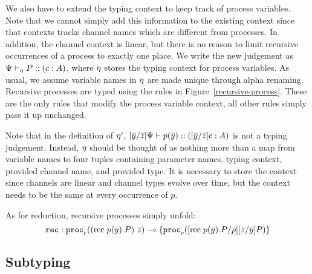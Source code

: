 \documentclass[a4paper,USenglish]{lipics-v2016}
\begin{document}
We also have to extend the typing context to keep track of process variables. Note that we cannot simply add this information to the existing context since that contexts tracks channel names which are different from processes. In addition, the channel context is linear, but there is no reason to limit recursive occurrences of a process to exactly one place. We write the new judgement as ${\Psi} \vdash_{\eta} P :: (c : A)$, where $\eta$ stores the typing context for process variables. As usual, we assume variable names in $\eta$ are made unique through alpha renaming. Recursive processes are typed using the rules in Figure~\ref{recursive-process}. These are the only rules that modify the process variable context, all other rules simply pass it up unchanged.


Note that in the definition of $\eta'$, $\lbrack{\bar{y}}/{\bar{z}}\rbrack{\Psi} \vdash {p}(\bar{y}) :: (\lbrack{\bar{y}}/{\bar{z}}\rbrack{c} : A)$ is not a typing judgement. Instead, $\eta$ should be thought of as nothing more than a map from variable names to four tuples containing parameter names, typing context, provided channel name, and provided type. It is necessary to store the context since channels are linear and channel types evolve over time, but the context needs to be the same at every occurrence of $p$.

As for reduction, recursive processes simply unfold:
$$ \texttt{rec} : \mathtt{proc}_{c}({(\mathrm{rec}\; {p}(\bar{y}) . {P})}~{\bar{z}})
     \multimap \lbrace \mathtt{proc}_{c}(\lbrack{\mathrm{rec}\; {p}(\bar{y}) . {P}}/{p}\rbrack{\lbrack{\bar{z}}/{\bar{y}}\rbrack{P}}) \rbrace
$$


\subsection{Subtyping}
\end{document}
